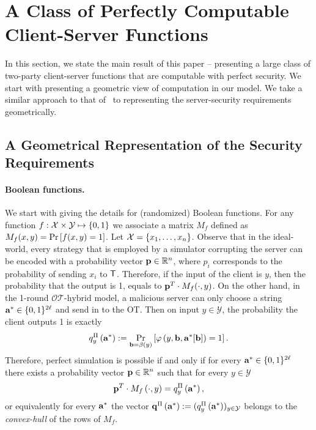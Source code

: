 \documentclass{llncs}
\newcommand{\OTfunc}{\mathcal{OT}}
\newcommand{\OThybrid}{\OTfunc\mbox{-}\text{hybrid}}
\newcommand{\X}{\mathcal{X}}
\newcommand{\Y}{\mathcal{Y}}
\newcommand{\p}{\myvec{p}}
\renewcommand{\q}{\myvec{q}}
\renewcommand{\b}{\myvec{b}}
\renewcommand{\a}{\myvec{a}}
\newcommand{\clnt}{\beta}
\newcommand{\local}{\varphi}
\begin{document}
\section{A Class of Perfectly Computable Client-Server Functions}\label{sec:main}
In this section, we state the main result of this paper -- presenting a large class of two-party client-server functions that are computable with perfect security. We start with presenting a geometric view of computation in our model. We take a similar approach to that of~\cite{Ash14} to representing the server-security requirements geometrically.

\subsection{A Geometrical Representation of the Security Requirements}
\paragraph{Boolean functions.}
We start with giving the details for (randomized) Boolean functions. For any function $f:\X\times\Y\mapsto\zo$ we associate a matrix $M_f$ defined as  $M_f(x,y)=\Pr\left[f(x,y)=1\right]$. Let $\X=\set{x_1,\ldots,x_n}$.
Observe that in the ideal-world, every strategy that is employed by a simulator corrupting the server can be encoded with a probability vector $\p\in\R^{n}$, where $p_i$ corresponds to the probability of sending $x_i$ to $\mathsf{T}$. Therefore, if the input of the client is $y$, then the probability that the output is 1, equals to $\p^T\cdot M_f(\cdot,y)$. 
On the other hand, in the 1-round $\OThybrid$ model, a malicious server can only choose a string $\a^*\in\zo^{2\ell}$ and send in to the OT. Then on input $y\in\Y$, the probability the client outputs 1 is exactly
$$q^{\Pi}_y\of{\a^*}:=\Pr_{\b=\clnt\of{y}}\left[\local\of{y,\b,\a^*[\b]}=1\right].$$
Therefore, perfect simulation is possible if and only if for every $\a^*\in\zo^{2\ell}$ there exists a probability vector $\p\in\R^n$ such that for every $y\in\Y$
$$\p^T\cdot M_f\of{\cdot,y}=q^{\Pi}_y\of{\a^*},$$
or equivalently for every $\a^*$ the vector $\q^{\Pi}\of{\a^*}:=(q^{\Pi}_y\of{\a^*})_{y\in\Y}$ belongs to the \emph{convex-hull} of the rows of $M_f$.
\end{document}

